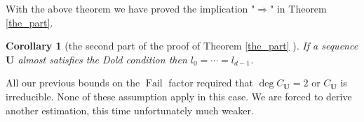 \documentclass[preprint,12pt]{elsarticle}
\DeclareMathOperator{\fail}{Fail}
\newtheorem{corollary}{Corollary}[theorem]
\begin{document}
With the above theorem we have proved the implication "$\Rightarrow$" in Theorem \ref{the_part}.

\begin{corollary}[the second part of the proof of Theorem \ref{the_part} ] 

If a sequence $\mathbf{U}$ almost satisfies the Dold condition then $l_0=\cdots=l_{d-1}$.
\end{corollary}
    




All our previous bounds on the $\fail$ factor required that $\deg C_\mathbf{U} = 2$ or $C_\mathbf{U}$ is irreducible. None of these assumption apply in this case. We are forced to derive another estimation, this time unfortunately much weaker. 
\end{document}
